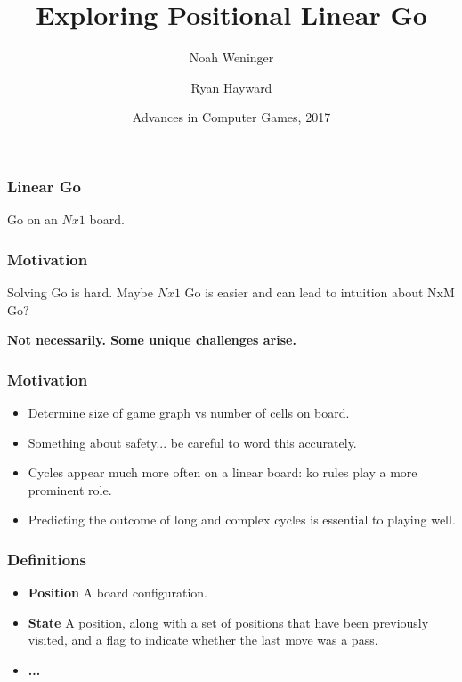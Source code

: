 \documentclass{beamer}
\title{Exploring Positional Linear Go}
\author[Weninger, Hayward]
{Noah Weninger \and Ryan Hayward}
\institute[University of Alberta]
{
  Department of Computing Science\\
  University of Alberta\\
  Canada
}
\date[ACG 2017]
{Advances in Computer Games, 2017}
\begin{document}
    \frame{\titlepage}

    \begin{frame}
        \frametitle{Linear Go}
        Go on an $Nx1$ board.
        \bigskip
        \begin{center}
            \cleargoban
            \showgoban[b2,j2]
        \end{center}
    \end{frame}

    \begin{frame}
        \frametitle{Motivation}
        Solving Go is hard. Maybe $Nx1$ Go is easier and can lead to intuition about NxM Go?
        \begin{center}
            \textbf{Not necessarily. Some unique challenges arise.}
        \end{center}
    \end{frame}
    \begin{frame}
        \frametitle{Motivation}
        \begin{itemize}[<+->]
            \item Determine size of game graph vs number of cells on board.
            \item Something about safety... be careful to word this accurately.
            \item Cycles appear much more often on a linear board: ko rules play a more prominent role.
            \item Predicting the outcome of long and complex cycles is essential to playing well.
        \end{itemize}
    \end{frame}

    \begin{frame}
        \frametitle{Definitions}
        \begin{itemize}[<+->]
            \item \textbf{Position} A board configuration.
            \item \textbf{State} A position, along with a set of positions that have been previously visited, and a flag to indicate whether the last move was a pass.
            \item \textbf{...}
        \end{itemize}
    \end{frame}
\end{document}
